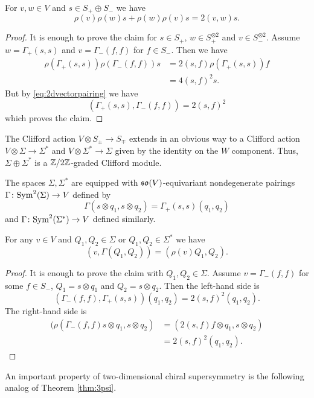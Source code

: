 \documentclass[10pt, oneside]{article}
\begin{document}
\begin{prop}
For $v,w\in V$ and $s\in S_+\oplus S_-$ we have
\[\rho(v)\rho(w)s + \rho(w)\rho(v) s = 2(v, w) s.\]
\end{prop}
\begin{proof}
It is enough to prove the claim for $s\in S_+$, $w\in S_+^{\otimes 2}$ and $v\in S_-^{\otimes 2}$. Assume $w=\Gamma_+(s, s)$ and $v = \Gamma_-(f, f)$ for $f\in S_-$. Then we have
\begin{align*}
\rho(\Gamma_+(s, s)) \rho(\Gamma_-(f, f)) s &= 2(s, f) \rho(\Gamma_+(s, s)) f \\
&= 4(s, f)^2 s.
\end{align*}
But by \eqref{eq:2dvectorpairing} we have
\[(\Gamma_+(s, s), \Gamma_-(f, f)) = 2(s, f)^2\]
which proves the claim.
\end{proof}

The Clifford action $V\otimes S_{\pm}\rightarrow S_{\mp}$ extends in an obvious way to a Clifford action $V\otimes \Sigma\rightarrow \Sigma^*$ and $V\otimes \Sigma^*\rightarrow \Sigma$ given by the identity on the $W$ component. Thus, $\Sigma\oplus \Sigma^*$ is a $\mathbb Z/2\mathbb Z$-graded Clifford module.

The spaces $\Sigma, \Sigma^*$ are equipped with $\mathfrak{so}(V)$-equivariant nondegenerate pairings $\Gamma\colon {\rm Sym}^2(\Sigma)\rightarrow V$ defined by
\[\Gamma(s\otimes q_1, s\otimes q_2) = \Gamma_+(s, s) (q_1, q_2)\]
and $\Gamma\colon {\rm Sym}^2(\Sigma^*)\rightarrow V$ defined similarly.

\begin{prop}
For any $v\in V$ and $Q_1, Q_2\in\Sigma$ or $Q_1, Q_2\in\Sigma^*$ we have
\[(v, \Gamma(Q_1, Q_2)) = (\rho(v) Q_1, Q_2).\]
\end{prop}
\begin{proof}
It is enough to prove the claim with $Q_1, Q_2\in\Sigma$. Assume $v = \Gamma_-(f, f)$ for some $f\in S_-$, $Q_1 = s\otimes q_1$ and $Q_2 = s\otimes q_2$. Then the left-hand side is
\[(\Gamma_-(f, f), \Gamma_+(s, s)) (q_1, q_2) = 2(s, f)^2 (q_1, q_2).\]
The right-hand side is
\begin{align*}
(\rho(\Gamma_-(f, f) s\otimes q_1, s\otimes q_2) &= (2(s, f) f\otimes q_1, s\otimes q_2) \\
&= 2(s, f)^2 (q_1, q_2).
\end{align*}
\end{proof}

An important property of two-dimensional chiral supersymmetry is the following analog of Theorem \ref{thm:3psi}.
\end{document}
